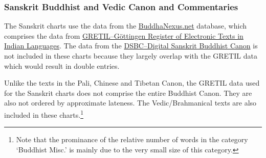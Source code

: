 \newpage
\subsubsection*{Sanskrit Buddhist and Vedic Canon and Commentaries}

The Sanskrit charts use the data from the \href{https://buddhanexus.net}{BuddhaNexus.net} database, which comprises the data from \href{http://gretil.sub.uni-goettingen.de/gretil.html}{GRETIL--Göttingen Register of Electronic Texts in Indian Languages}. The data from the \href{http://www.dsbcproject.org/}{DSBC--Digital Sanskrit Buddhist Canon} is not included in these charts because they largely overlap with the GRETIL data which would result in double entries.

Unlike the texts in the Pali, Chinese and Tibetan Canon, the GRETIL data used for the Sanskrit charts does not comprise the entire Buddhist Canon. They are also not ordered by approximate lateness. The Vedic/Brahmanical texts are also included in these charts.\footnote{Note that the prominance of the relative number of words in the category `Buddhist Misc.' is mainly due to the very small size of this category.}

